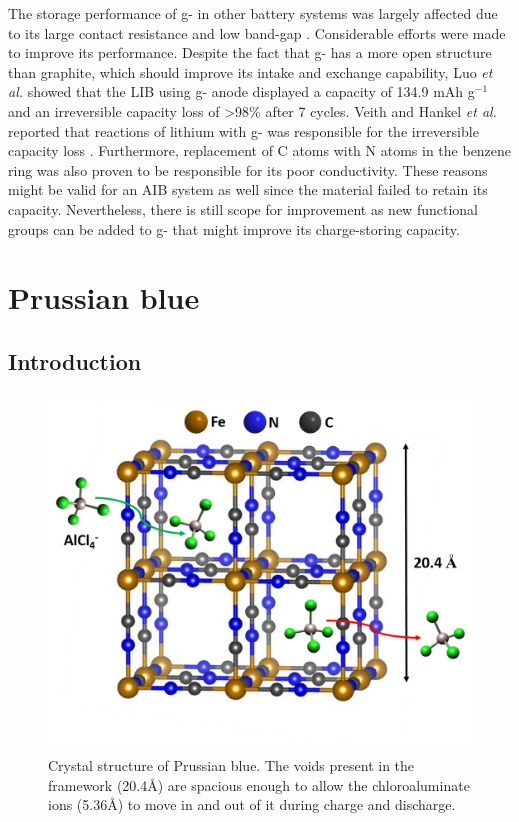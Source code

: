 The storage performance of g- in other battery systems was largely affected due to its large contact resistance and low band-gap \cite{shah_highly_2017}. Considerable efforts were made to improve its performance. Despite the fact that g- has a more open structure than graphite, which should improve its  intake and exchange capability, Luo \cite{luo_graphitic_2019} \textit{et al.} showed that the LIB using g- anode displayed a capacity of 134.9 mAh g$^{-1}$ and an irreversible capacity loss of >98\% after 7 cycles. Veith and Hankel \textit{et al.} reported that reactions of lithium with g- was responsible for the irreversible capacity loss \cite{veith_electrochemical_2013, hankel_lithium_2015}. Furthermore, replacement of C atoms with N atoms in the benzene ring was also proven to be responsible for its poor conductivity. These reasons might be valid for an AIB system as well since the material failed to retain its capacity. Nevertheless, there is still scope for improvement as new functional groups can be added to g- that might improve its charge-storing capacity. 

\section{Prussian blue}

\subsection{Introduction}

 \begin{figure}[th!]
  \centering
  \includegraphics[width=\textwidth]{Figures/chap6fig/pbcrys}
    \caption{Crystal structure of Prussian blue. The voids present in the framework (20.4\AA) are spacious enough to allow the chloroaluminate ions (5.36\AA) to move in and out of it during charge and discharge. }
  \label{Figures/chap6fig:pbcrys}
\end{figure}

